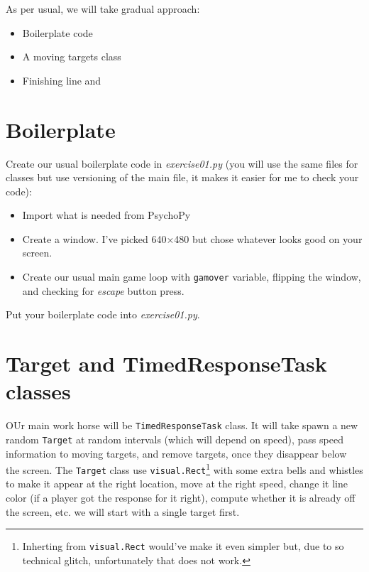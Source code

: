 \documentclass[
]{book}
\providecommand{\tightlist}{%
  \setlength{\itemsep}{0pt}\setlength{\parskip}{0pt}}
\begin{document}
As per usual, we will take gradual approach:

\begin{itemize}
\tightlist
\item
  Boilerplate code
\item
  A moving targets class
\item
  Finishing line and
\end{itemize}

\hypertarget{boilerplate-1}{%
\section{Boilerplate}\label{boilerplate-1}}

Create our usual boilerplate code in \emph{exercise01.py} (you will use the same files for classes but use versioning of the main file, it makes it easier for me to check your code):

\begin{itemize}
\tightlist
\item
  Import what is needed from PsychoPy
\item
  Create a window. I've picked 640×480 but chose whatever looks good on your screen.
\item
  Create our usual main game loop with \texttt{gamover} variable, flipping the window, and checking for \emph{escape} button press.
\end{itemize}

Put your boilerplate code into \emph{exercise01.py}.

\hypertarget{target-and-timedresponsetask-classes}{%
\section{Target and TimedResponseTask classes}\label{target-and-timedresponsetask-classes}}

OUr main work horse will be \texttt{TimedResponseTask} class. It will take spawn a new random \texttt{Target} at random intervals (which will depend on speed), pass speed information to moving targets, and remove targets, once they disappear below the screen. The \texttt{Target} class use \texttt{visual.Rect}\footnote{Inherting from \texttt{visual.Rect} would've make it even simpler but, due to so technical glitch, unfortunately that does not work.} with some extra bells and whistles to make it appear at the right location, move at the right speed, change it line color (if a player got the response for it right), compute whether it is already off the screen, etc. we will start with a single target first.
\end{document}
